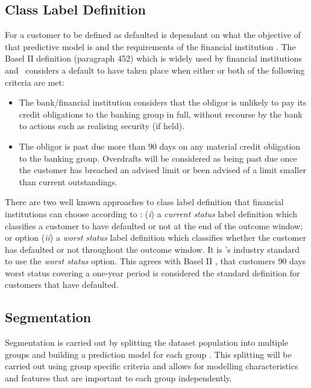 \subsection{Class Label Definition} \label{classLabelDef}
For a customer to be defined as defaulted is dependant on what the objective of that predictive model is and the requirements of the financial institution \citep{mcnab_principles_2000}. The Basel II definition (paragraph 452) which is widely used by financial institutions and \subjectname\ considers a default to have taken place when either or both of the following criteria are met:
\vspace{-3mm} 
\begin{itemize}
	\item The bank/financial institution considers that the obligor is unlikely to pay its credit obligations to the banking group in full, without recourse by the bank to actions such as realising security (if held).
	\item The obligor is past due more than 90 days on any material credit obligation to the banking group. Overdrafts will be considered as being past due once the customer has breached an advised limit or been advised of a limit smaller than current outstandings.
\end{itemize} 

There are two well known approaches to class label definition that financial institutions can choose according to \cite{anderson_credit_2007}: (\textit{i}) a \textit{current status} label definition which classifies a customer to have defaulted or not at the end of the outcome window; or option (\textit{ii}) a \textit{worst status} label definition which classifies whether the customer has defaulted or not throughout the outcome window. It is \subjectname's industry standard to use the \textit{worst status} option. This agrees with Basel II \citep{basel_international_2006}, that customers 90 days worst status covering a one-year period is considered the standard definition for customers that have defaulted. 


\subsection{Segmentation}\label{sec:segment}
Segmentation is carried out by splitting the dataset population into multiple groups and building a prediction model for each group \citep{myatt_making_2007}. This splitting will be carried out using group specific criteria and allows for modelling characteristics and features that are important to each group independently.


